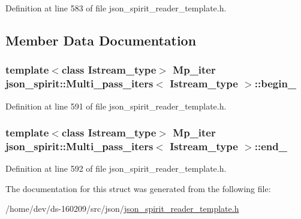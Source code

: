 Definition at line 583 of file json\+\_\+spirit\+\_\+reader\+\_\+template.\+h.



\subsection{Member Data Documentation}
\hypertarget{structjson__spirit_1_1_multi__pass__iters_a529ba1f47c74054bff695c277ec3b3b4}{}
\subsubsection[{begin\+\_\+}]{\setlength{\rightskip}{0pt plus 5cm}template$<$class Istream\+\_\+type$>$ {\bf Mp\+\_\+iter} {\bf json\+\_\+spirit\+::\+Multi\+\_\+pass\+\_\+iters}$<$ Istream\+\_\+type $>$\+::begin\+\_\+}\label{structjson__spirit_1_1_multi__pass__iters_a529ba1f47c74054bff695c277ec3b3b4}


Definition at line 591 of file json\+\_\+spirit\+\_\+reader\+\_\+template.\+h.

\hypertarget{structjson__spirit_1_1_multi__pass__iters_afd43bdc90a846d2caa93846a069f9cbe}{}
\subsubsection[{end\+\_\+}]{\setlength{\rightskip}{0pt plus 5cm}template$<$class Istream\+\_\+type$>$ {\bf Mp\+\_\+iter} {\bf json\+\_\+spirit\+::\+Multi\+\_\+pass\+\_\+iters}$<$ Istream\+\_\+type $>$\+::end\+\_\+}\label{structjson__spirit_1_1_multi__pass__iters_afd43bdc90a846d2caa93846a069f9cbe}


Definition at line 592 of file json\+\_\+spirit\+\_\+reader\+\_\+template.\+h.



The documentation for this struct was generated from the following file\+:\begin{DoxyCompactItemize}
\item 
/home/dev/ds-\/160209/src/json/\hyperlink{json__spirit__reader__template_8h}{json\+\_\+spirit\+\_\+reader\+\_\+template.\+h}\end{DoxyCompactItemize}
